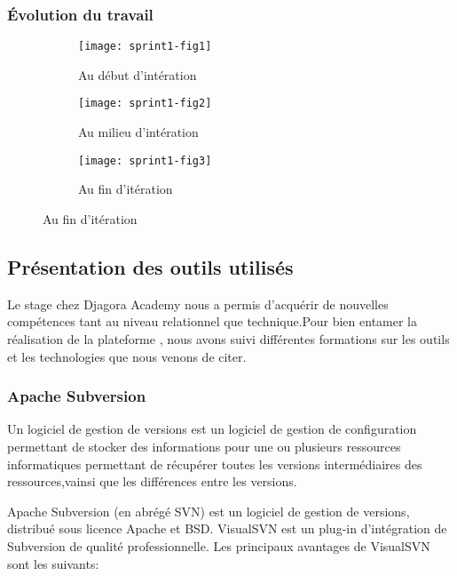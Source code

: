 \subsubsection{Évolution du travail}

\begin{figure}[htbp]
    \centering
    \caption{Évoluation du travail}
    \begin{subfigure}{1\textwidth}
        \centering
        \texttt{[image: sprint1-fig1]}
        \caption{Au début d'intération}
        \label{fig:sprint1-fig1}
    \end{subfigure}

    \begin{subfigure}{1\textwidth}
        \centering
        \texttt{[image: sprint1-fig2]}
        \caption{Au milieu d'intération}
        \label{fig:sprint1-fig2}
    \end{subfigure}

    \begin{subfigure}{1\textwidth}
        \centering
        \texttt{[image: sprint1-fig3]}
        \caption{Au fin d'itération}
        \label{fig:sprint1-fig3}
    \end{subfigure}
\end{figure}
\clearpage

\subsection{Présentation des outils utilisés}

Le stage chez Djagora Academy nous a permis d'acquérir de nouvelles
compétences tant au niveau relationnel que technique.Pour bien entamer la réalisation
de la plateforme
, nous avons suivi différentes
formations sur les outils et les technologies que nous venons de citer.

\subsubsection{Apache Subversion}

Un logiciel de gestion de versions est un logiciel de gestion de configuration
permettant de stocker des informations pour une ou plusieurs ressources
informatiques permettant de récupérer toutes les versions intermédiaires des
ressources,vainsi que les différences entre les versions.

Apache Subversion (en abrégé SVN) est un logiciel de gestion de versions,
distribué sous licence Apache et BSD.
VisualSVN est un plug-in d'intégration de Subversion de qualité professionnelle.
Les principaux avantages de VisualSVN sont les suivants:

